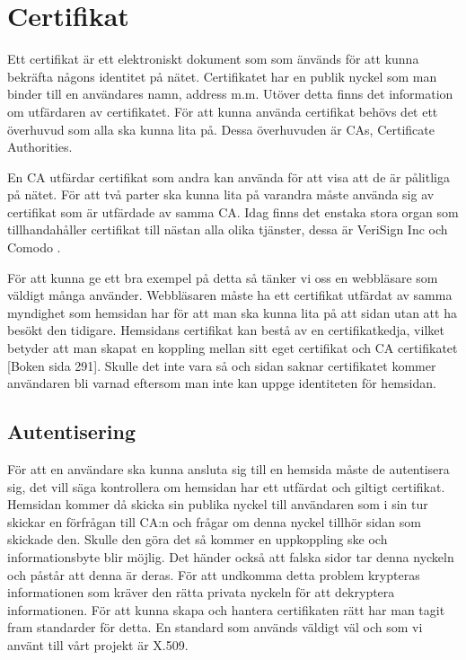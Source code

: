 \section{Certifikat}
Ett certifikat är ett elektroniskt dokument som som änvänds för att kunna bekräfta någons identitet på nätet. Certifikatet har en publik nyckel som man binder till en användares namn, address m.m. 
Utöver detta finns det information om utfärdaren av certifikatet. 
För att kunna använda certifikat behövs det ett överhuvud som alla ska kunna lita på. 
Dessa överhuvuden är CAs, Certificate Authorities. 

En CA utfärdar certifikat som andra kan använda för att visa att de är pålitliga på nätet. För att två parter ska kunna lita på varandra måste använda sig av certifikat som är utfärdade av samma CA. Idag finns det enstaka stora organ som tillhandahåller certifikat till nästan alla olika tjänster, dessa är VeriSign Inc och Comodo  \cite{Certificate}.

För att kunna ge ett bra exempel på detta så tänker vi oss en webbläsare som väldigt många använder. Webbläsaren måste ha ett certifikat utfärdat av samma myndighet som hemsidan har för att man ska kunna lita på att sidan utan att ha besökt den tidigare. Hemsidans certifikat kan bestå av en certifikatkedja, vilket betyder att man skapat en koppling mellan sitt eget certifikat och CA certifikatet [Boken sida 291]. Skulle det inte vara så och sidan saknar certifikatet kommer användaren bli varnad eftersom man inte kan uppge identiteten för hemsidan.

\subsection{Autentisering}
För att en användare ska kunna ansluta sig till en hemsida måste de autentisera sig, det vill säga kontrollera om hemsidan har ett utfärdat och giltigt certifikat. Hemsidan kommer då skicka sin publika nyckel till användaren som i sin tur skickar en förfrågan till CA:n och frågar om denna nyckel tillhör sidan som skickade den. Skulle den göra det så kommer en uppkoppling ske och informationsbyte blir möjlig.
Det händer också att falska sidor tar denna nyckeln och påstår att denna är deras. För att undkomma detta problem krypteras informationen som kräver den rätta privata nyckeln för att dekryptera informationen.
För att kunna skapa och hantera certifikaten rätt har man tagit fram standarder för detta. En standard som används väldigt väl och som vi använt till vårt projekt är X.509.                                         

